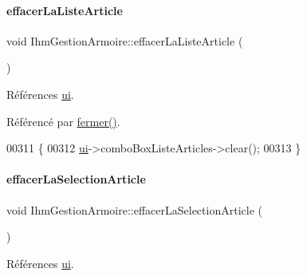 \mbox{\label{class_ihm_gestion_armoire_a65cf47ddfe3942435b5f3bf40578d96a}} 
\paragraph{\texorpdfstring{effacer\+La\+Liste\+Article}{effacerLaListeArticle}}
{\footnotesize\ttfamily void Ihm\+Gestion\+Armoire\+::effacer\+La\+Liste\+Article (\begin{DoxyParamCaption}{ }\end{DoxyParamCaption})\hspace{0.3cm}{\ttfamily [slot]}}



Références \hyperlink{class_ihm_gestion_armoire_a793a2816dc21b3161566138d2af5a8b9}{ui}.



Référencé par \hyperlink{class_ihm_gestion_armoire_a7fef1d21e4dcce9c4550d33b15e8dc29}{fermer()}.


\begin{DoxyCode}
00311 \{
00312     \hyperlink{class_ihm_gestion_armoire_a793a2816dc21b3161566138d2af5a8b9}{ui}->comboBoxListeArticles->clear();
00313 \}
\end{DoxyCode}
\mbox{\label{class_ihm_gestion_armoire_aa432c67c648097bbec288694077d83e6}} 
\paragraph{\texorpdfstring{effacer\+La\+Selection\+Article}{effacerLaSelectionArticle}}
{\footnotesize\ttfamily void Ihm\+Gestion\+Armoire\+::effacer\+La\+Selection\+Article (\begin{DoxyParamCaption}{ }\end{DoxyParamCaption})\hspace{0.3cm}{\ttfamily [slot]}}



Références \hyperlink{class_ihm_gestion_armoire_a793a2816dc21b3161566138d2af5a8b9}{ui}.



